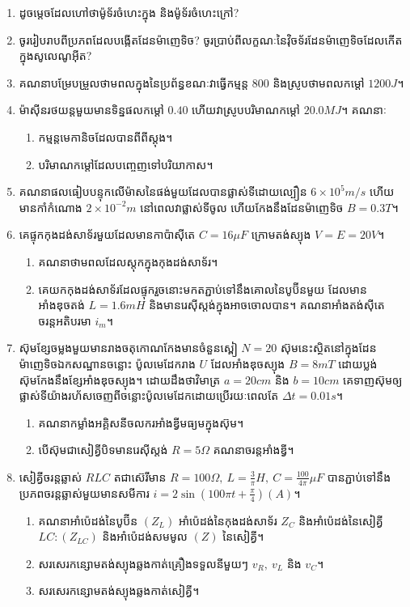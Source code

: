\documentclass{officialexam}
\begin{document}
\begin{enumerate}[I]
	\item ដូចម្តេចដែលហៅថាម៉ូទ័រចំហេះក្នុង និងម៉ូទ័រចំហេះក្រៅ?
	\item ចូររៀបរាបពីប្រភពដែលបង្កើតដែនម៉ាញេទិច? ចូរប្រាប់ពីលក្ខណៈនៃវុិចទ័រដែនម៉ាញេទិចដែលកើតក្នុងសូលេណូអុីត?
	\item គណនាបម្រែបម្រួលថាមពលក្នុងនៃប្រព័ន្ធខណៈវាធ្វើកម្មន្ត $800$ និងស្រូបថាមពលកម្តៅ $1200J$។
	\item ម៉ាសុីនរថយន្តមួយមានទិន្នផលកម្តៅ $0.40$ ហើយវាស្រូបបរិមាណកម្តៅ $20.0MJ$។ គណនាៈ
	\begin{enumerate}[k]
		\item កម្មន្តមេកានិចដែលបានពីពីស្តុង។
		\item បរិមាណកម្តៅដែលបញ្ចេញទៅបរិយាកាស។
	\end{enumerate}
	\item គណនាផលធៀបបន្ទុកលើម៉ាសនៃផង់មួយដែលបានផ្លាស់ទីដោយល្បឿន $6\times10^{5}m/s$ ហើយមានកាំកំណោង $2\times10^{-2}m$ នៅពេលវាផ្លាស់ទីចូល ហើយកែងនឹងដែនម៉ាញេទិច $B=0.3T$។
	\item គេផ្ទុកកុងដង់សាទ័រមួយដែលមានកាប៉ាសុីតេ $C=16\mu F$ ក្រោមតង់ស្យុង $V=E=20V$។
	\begin{enumerate}[k]
		\item គណនាថាមពលដែលស្តុកក្នុងកុងដង់សាទ័រ។
		\item គេយកកុងដង់សាទ័រដែលផ្ទុករួចនោះមកតភ្ជាប់ទៅនឹងគោលនៃបូប៊ីនមួយ ដែលមានអាំងឌុចតង់ $L=1.6mH$ និងមានរេសុីស្តង់ក្នុងអាចចោលបាន។ គណនាអាំងតង់សុីតេចរន្តអតិបរមា $i_{m}$។
	\end{enumerate}
	\item ស៊ុមខ្សែចម្លងមួយមានរាងចតុកោណកែងមានចំនួនស្ពៀ $N=20$ ស៊ុមនេះស្ថិតនៅក្នុងដែនម៉ាញេទិចឯកសណ្ឋានចន្លោះ ប៉ូលមេដែករាង $U$ ដែលអាំងឌុចស្យុង $B=8mT$ ដោយប្លង់ស៊ុមកែងនឹងខ្សែអាំងឌុចស្យុង។ ដោយដឹងថាវិមាត្រ $a=20cm$ និង $b=10cm$ គេទាញស៊ុមឲ្យផ្លាស់ទីយ៉ាងរហ័សចេញពីចន្លោះប៉ូលមេដែកដោយប្រើរយៈពេលតែ $\Delta t=0.01s$។
	\begin{enumerate}[k]
		\item គណនាកម្លាំងអគ្គិសនីចលករអាំងឌ្វីមធ្យមក្នុងស៊ុម។
		\item បើស៊ុមជាសៀគ្វីបិទមានរេសុីស្តង់ $R=5\Omega$ គណនាចរន្តអាំងឌ្វី។
	\end{enumerate}
	\item សៀគ្វីចរន្តឆ្លាស់ $RLC$ តជាស៊េរីមាន $R=100\Omega,~L=\frac{3}{\pi}H,~C=\frac{100}{4\pi}\mu F$ បានភ្ជាប់ទៅនឹងប្រភពចរន្តឆ្លាស់មួយមានសមីការ $i=2\sin\left(100\pi t+\frac{\pi}{4}\right)\left(A\right)$។
	\begin{enumerate}[k]
		\item គណនាអាំប៉េដង់នៃបូប៊ីន $\left(Z_{L}\right)$ អាំប៉េដង់នៃកុងដង់សាទ័រ $Z_{C}$ និងអាំប៉េដង់នៃសៀគ្វី $LC:\left(Z_{LC}\right)$ និងអាំប៉េដង់សមមូល $\left(Z\right)$ នៃសៀគ្វី។
		\item សរសេរកន្សោមតង់ស្យុងឆ្លងកាត់គ្រឿងទទួលនីមួយៗ $v_{R},~v_{L}$ និង $v_{C}$។
		\item សរសេរកន្សោមតង់ស្យុងឆ្លងកាត់សៀគ្វី។
	\end{enumerate}
\end{enumerate}
\end{document}
